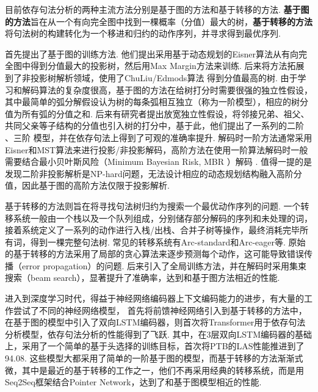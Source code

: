 目前依存句法分析的两种主流方法分别是基于图的方法和基于转移的方法.
\textbf{基于图的方法}旨在从一个有向完全图中找到一棵概率（分值）最大的树，\textbf{基于转移的方法}将句法树的构建转化为一个移进和归约的动作序列，并寻求得到最优序列.

\citet{mcdonald-etal-2005-online}首先提出了基于图的训练方法.
他们提出采用基于动态规划的Eisner算法从有向完全图中得到分值最大的投影树，然后用Max Margin方法来训练.
后来\citet{mcdonald-etal-2005-non}将方法拓展到了非投影树解析领域，使用了ChuLiu/Edmods算法 \citep{chu-1965-shortest}得到分值最高的树.
由于学习和解码算法的复杂度很高，基于图的方法在给树打分时需要很强的独立性假设，其中最简单的弧分解假设认为树的每条弧相互独立（称为一阶模型），相应的树分值为所有弧的分值之和.
后来有研究者提出放宽独立性假设，将邻接兄弟、祖父、共同父亲等子结构的分值也引入树的打分中，基于此，他们提出了一系列的二阶 \citep{mcdonald-pereira-2006-online,carreras-2007-experiments}、三阶 \citep{koo-collins-2010-efficient}模型，并在依存句法上得到了可观的准确率提升.
解码时一阶方法通常采用Eisner和MST算法来进行投影/非投影解码，高阶方法在使用一阶算法解码时一般需要结合最小贝叶斯风险（Minimum Bayesian Risk, MBR ）解码 \citep{smith-smith-2007-probabilistic}.
值得一提的是\citet{mcdonald-pereira-2006-online}发现二阶非投影解析是NP-hard问题，无法设计相应的动态规划结构融入高阶分值，因此基于图的高阶方法仅限于投影解析.

基于转移的方法则旨在将寻找句法树归约为搜索一个最优动作序列的问题.
一个转移系统一般由一个栈以及一个队列组成，分别储存部分解码的序列和未处理的词，接着系统定义了一系列的动作进行入栈/出栈、合并子树等操作，最终消耗完毕所有词，得到一棵完整句法树.
常见的转移系统有Arc-standard和Arc-eager等.
原始的基于转移的方法采用了局部的贪心算法来逐步预测每个动作，这可能导致错误传播（error propagation）的问题.
后来\citet{zhang-clark-2008-tale,huang-etal-2009-bilingually}引入了全局训练方法，并在解码时采用集束搜索（beam search），显著提升了准确率，达到和基于图方法相近的性能.

进入到深度学习时代，得益于神经网络编码器上下文编码能力的进步，有大量的工作尝试了不同的神经网络模型，
\citet{chen-manning-2014-fast}首先将前馈神经网络引入到基于转移的方法中，\citet{kiperwasser-goldberg-2016-simple,wang-chang-2016-graph}在基于图的模型中引入了双向LSTM编码器，\citet{li-etal-2019-attentive}则首次将Transformer用于依存句法分析模型，依存句法分析的性能得到了飞跃.
其中，\citet{dozat-etal-2017-biaffine}在3层双向LSTM编码器的基础上，采用了一个简单的基于头选择的训练目标，首次将PTB的LAS性能推进到了94.08.
这些模型大都采用了简单的一阶基于图的模型，而基于转移的方法渐渐式微，其中\citet{ma-etal-2018-stack}是最近的基于转移的工作之一，他们不再采用经典的转移系统，而是用Seq2Seq框架结合Pointer Network，达到了和基于图模型相近的性能.

